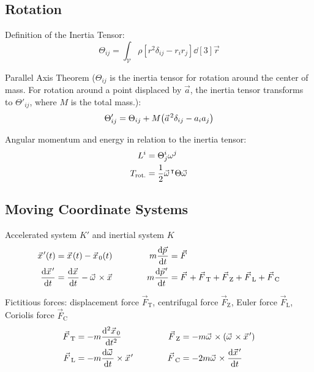 	\subsection{Rotation}
		\noindent
		Definition of the Inertia Tensor:
		\begin{equation}
			\Theta_{ij}=\int_{\mathcal{V}} \rho \left[r^2\delta_{ij}-r_i r_j\right] \dd[3]{\vec{r}}
		\end{equation}

		\noindent
		Parallel Axis Theorem ($\Theta_{ij}$ is the inertia tensor for rotation around the center of mass.
		For rotation around a point displaced by $\vec{a}$, the inertia tensor transforms to $\Theta'_{ij}$, where $M$ is the total mass.):
		\begin{equation}
			\Theta'_{ij} = \Theta_{ij} + M\qty(\vec{a}^2\delta_{ij} - a_i a_j)
		\end{equation}

		\noindent
		Angular momentum and energy in relation to the inertia tensor:
		\begin{equation}
			\begin{aligned}
				L^i &= \Theta^i_j \omega^j \\
				T_{\text{rot.}} &= \frac{1}{2}\vec{\omega}^\trp \Theta \vec{\omega}
			\end{aligned}
		\end{equation}

	\subsection{Moving Coordinate Systems}
		\noindent
		Accelerated system $K'$ and inertial system $K$
		\begin{equation}
			\begin{aligned}
				\vec{x}'(t) &= \vec{x}(t)-\vec{x}_0(t) &\hsp
				m\dv{\vec{p}}{t} &= \vec{F} \\
				\dv{\vec{x}'}{t} &= \dv{\vec{x}}{t}-\vec{\omega}\times\vec{x} &\hsp
				m\dv{\vec{p}'}{t} &= \vec{F} + \vec{F}_\text{T} + \vec{F}_\text{Z} + \vec{F}_\text{L} + \vec{F}_\text{C} \\
			\end{aligned}
		\end{equation}

		\noindent
		Fictitious forces: displacement force $\vec{F}_\text{T}$, centrifugal force $\vec{F}_\text{Z}$, Euler force $\vec{F}_\text{L}$, Coriolis force $\vec{F}_\text{C}$
		\begin{equation}
			\begin{aligned}
				\vec{F}_\text{T} &= -m\dv[2]{\vec{x}_0}{t} &\hsp
				\vec{F}_\text{Z} &= -m\vec{\omega}\times\qty(\vec{\omega}\times\vec{x}') \\
				\vec{F}_\text{L} &= -m\dv{\vec{\omega}}{t}\times\vec{x}' &\hsp
				\vec{F}_\text{C} &= -2m\vec{\omega}\times\dv{\vec{x}'}{t} \\
			\end{aligned}
		\end{equation}


